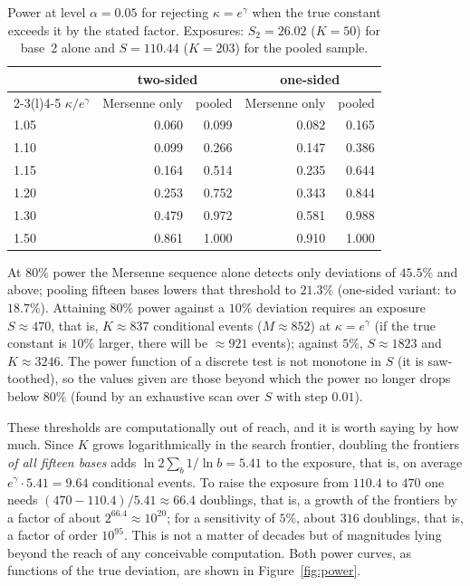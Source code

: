 \documentclass[11pt,a4paper]{article}
\theoremstyle{plain}
\theoremstyle{remark}
\newcommand{\eg}{e^{\gamma}}
\begin{document}
\begin{table}[t]
\centering
\caption{Power at level $\alpha=0.05$ for rejecting $\kappa=\eg$ when the true
constant exceeds it by the stated factor. Exposures: $S_2=26.02$ ($K=50$) for base~2
alone and $S=110.44$ ($K=203$) for the pooled sample.}
\label{tab:power}
\small
\begin{tabular}{lrr@{\qquad}rr}
\toprule
& \multicolumn{2}{c}{two-sided} & \multicolumn{2}{c}{one-sided}\\
\cmidrule(r){2-3}\cmidrule(l){4-5}
$\kappa/\eg$ & Mersenne only & pooled & Mersenne only & pooled\\
\midrule
1.05 & 0.060 & 0.099 & 0.082 & 0.165\\
1.10 & 0.099 & 0.266 & 0.147 & 0.386\\
1.15 & 0.164 & 0.514 & 0.235 & 0.644\\
1.20 & 0.253 & 0.752 & 0.343 & 0.844\\
1.30 & 0.479 & 0.972 & 0.581 & 0.988\\
1.50 & 0.861 & 1.000 & 0.910 & 1.000\\
\bottomrule
\end{tabular}
\end{table}

At $80\%$ power the Mersenne sequence alone detects only deviations of $45.5\%$
and above; pooling fifteen bases lowers that threshold to $21.3\%$ (one-sided
variant: to $18.7\%$). Attaining $80\%$ power against a $10\%$ deviation requires
an exposure $S\approx470$, that is, $K\approx837$ conditional events
($M\approx852$) at $\kappa=\eg$ (if the true constant is $10\%$ larger, there
will be $\approx921$ events); against $5\%$, $S\approx1823$ and $K\approx3246$.
The power function of a discrete test is not monotone in $S$ (it is
saw-toothed), so the values given are those beyond which the power no longer
drops below $80\%$ (found by an exhaustive scan over $S$ with step $0.01$).

These thresholds are computationally out of reach, and it is worth saying by how
much. Since $K$ grows logarithmically in the search frontier, doubling the
frontiers \emph{of all fifteen bases} adds $\ln2\sum_b1/\ln b=5.41$ to the
exposure, that is, on average $\eg\cdot5.41=9.64$ conditional events. To raise
the exposure from $110.4$ to $470$ one needs $(470-110.4)/5.41\approx66.4$
doublings, that is, a growth of the frontiers by a factor of about
$2^{66.4}\approx10^{20}$; for a sensitivity of $5\%$, about $316$ doublings, that
is, a factor of order $10^{95}$. This is not a
matter of decades but of magnitudes lying beyond the reach of any conceivable
computation. Both power curves, as functions of the true deviation, are shown in
Figure~\ref{fig:power}.
\end{document}

